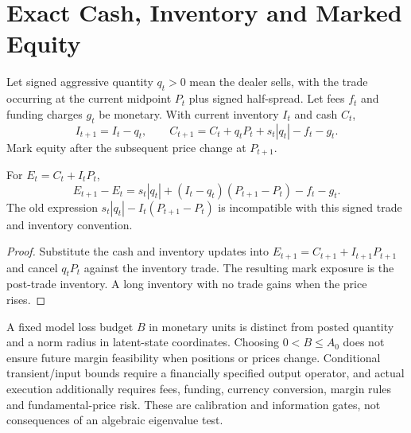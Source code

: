 \section{Exact Cash, Inventory and Marked Equity}
Let signed aggressive quantity $q_t>0$ mean the dealer sells, with the trade occurring at the current midpoint $P_t$ plus signed half-spread. Let fees $f_t$ and funding charges $g_t$ be monetary. With current inventory $I_t$ and cash $C_t$,
\[
I_{t+1}=I_t-q_t,\qquad
C_{t+1}=C_t+q_tP_t+s_t|q_t|-f_t-g_t.
\]
Mark equity after the subsequent price change at $P_{t+1}$.
\begin{proposition}
For $E_t=C_t+I_tP_t$,
\[
E_{t+1}-E_t=s_t|q_t|+(I_t-q_t)(P_{t+1}-P_t)-f_t-g_t.
\]
The old expression $s_t|q_t|-I_t(P_{t+1}-P_t)$ is incompatible with this signed trade and inventory convention.
\end{proposition}
\begin{proof}
Substitute the cash and inventory updates into $E_{t+1}=C_{t+1}+I_{t+1}P_{t+1}$ and cancel $q_tP_t$ against the inventory trade. The resulting mark exposure is the post-trade inventory. A long inventory with no trade gains when the price rises.
\end{proof}

A fixed model loss budget $B$ in monetary units is distinct from posted quantity and a norm radius in latent-state coordinates. Choosing $0<B\le A_0$ does not ensure future margin feasibility when positions or prices change. Conditional transient/input bounds require a financially specified output operator, and actual execution additionally requires fees, funding, currency conversion, margin rules and fundamental-price risk. These are calibration and information gates, not consequences of an algebraic eigenvalue test.
